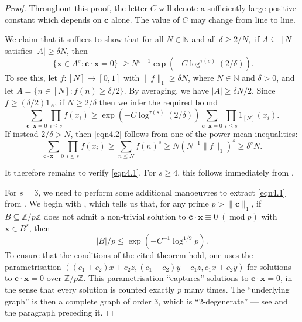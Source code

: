 \documentclass[12pt, reqno]{amsart}
\theoremstyle{definition}
\theoremstyle{remark}
\numberwithin{equation}{section}
\theoremstyle{definition}
\DeclareMathOperator{\Mod}{mod}
\newcommand{\mmod}[1]{\;(\Mod{ #1})}
\def\del{{\delta}} \def\Del{{\Delta}}
\def\le{\leqslant} \def\ge{\geqslant} \def\pleq{\preccurlyeq} \def\ple{\prec}
\def \bN {\mathbb N}
\def \bc {\mathbf c}
\def \bx {\mathbf x}
\def \N {\mathbb{N}}
\def \Z {\mathbb{Z}}
\begin{document}
\begin{proof}
Throughout this proof, the letter $C$ will denote a sufficiently large positive constant which depends on $\bc$ alone. The value of $C$ may change from line to line.
    
We claim that it suffices to show that for all $N\in\N$ and all 
$
\del \ge 2/N,
$
if $A\subseteq[N]$ satisfies $|A|\geqslant\delta N$, then
\begin{equation}
\label{eqn4.1}
|\{\bx\in A^s: \bc\cdot\bx = 0\}| \geqslant N^{s-1}\exp(-C\log^{\tau(s)}(2/\delta)).
\end{equation}
To see this, let $f:[N]\to[0,1]$ with $\lVert f\rVert_1 \geqslant \delta N$, where $N \in \bN$ and $\del > 0$, and let $A = \{ n\in[N]: f(n) \geqslant \del/2\}$. By averaging, we have $|A|\geqslant \del N/2$.
Since $f\geqslant (\delta/2)1_A$, if $N\geqslant 2/\del$ then we infer the required bound
\begin{equation}
\label{eqn4.2}
\sum_{\bc \cdot \bx = 0} \prod_{i \le s} f(x_i)
\geqslant \exp(-C\log^{\tau(s)}(2/\delta)) \sum_{\bc \cdot \bx = 0} \prod_{i \le s} 1_{[N]}(x_i).
\end{equation}
If instead $2/\del > N$, then \eqref{eqn4.2} follows from one of the power mean inequalities:
\[
\sum_{\bc \cdot \bx = 0} \prod_{i \le s} f(x_i) \ge \sum_{n \le N} f(n)^s \ge N (N^{-1} \| f \|_1)^s \ge \del^s N.
\]

It therefore remains to verify \eqref{eqn4.1}. For $s\geqslant 4$, this follows immediately from \cite[Theorem 3]{Kos}. 

\bigskip

For $s=3$, we need to perform some additional manoeuvres to extract \eqref{eqn4.1} from \cite{FHHK2024}. We begin with \cite[Theorem 1.5 (ii)]{FHHK2024}, which tells us that, for any prime $p>\lVert \bc\rVert_1$, if $B\subseteq\Z/p\Z$ does not admit a non-trivial solution to $\bc\cdot\bx \equiv 0 \mmod{p}$ with $\bx \in B^s$, then
\begin{equation*}
|B|/p\leqslant \exp(-C^{-1}\log^{1/9}p).
\end{equation*}
To ensure that the conditions of the cited theorem hold, one uses the parametrisation $({(c_1+c_2)x + c_2z, (c_1+c_2)y - c_1z, c_1x + c_2y})$ for solutions to $\bc\cdot\bx = 0$ over $\Z/p\Z$. This parametrisation ``captures'' solutions to $\bc\cdot\bx = 0$, in the sense that every solution is counted exactly $p$ many times.
The ``underlying graph'' is then a complete graph of order $3$, which is ``$2$-degenerate'' --- see \cite[Example 1.7]{FHHK2024} and the paragraph preceding it.
    

\end{proof}
\end{document}
